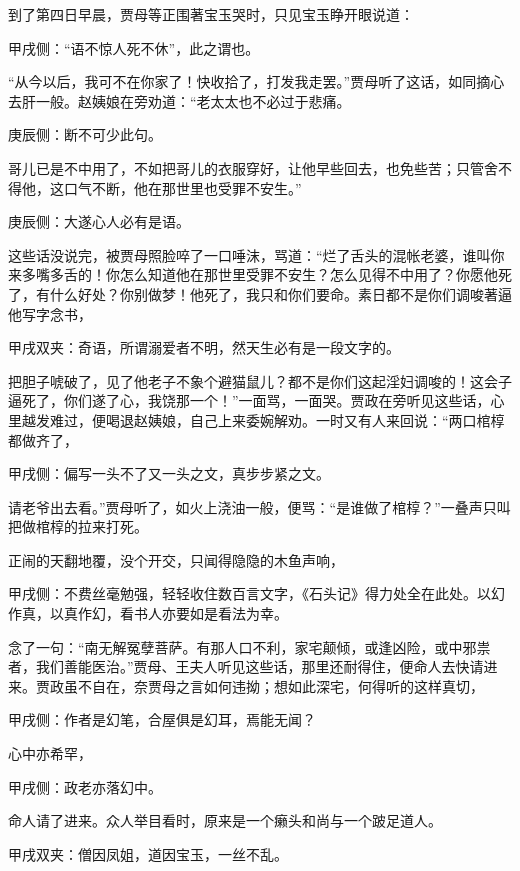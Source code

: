\begin{parag}
    到了第四日早晨，贾母等正围著宝玉哭时，只见宝玉睁开眼说道：\begin{note}甲戌侧：“语不惊人死不休”，此之谓也。\end{note}“从今以后，我可不在你家了！快收拾了，打发我走罢。”贾母听了这话，如同摘心去肝一般。赵姨娘在旁劝道：“老太太也不必过于悲痛。\begin{note}庚辰侧：断不可少此句。\end{note}哥儿已是不中用了，不如把哥儿的衣服穿好，让他早些回去，也免些苦；只管舍不得他，这口气不断，他在那世里也受罪不安生。”\begin{note}庚辰侧：大遂心人必有是语。\end{note}这些话没说完，被贾母照脸啐了一口唾沫，骂道：“烂了舌头的混帐老婆，谁叫你来多嘴多舌的！你怎么知道他在那世里受罪不安生？怎么见得不中用了？你愿他死了，有什么好处？你别做梦！他死了，我只和你们要命。素日都不是你们调唆著逼他写字念书，\begin{note}甲戌双夹：奇语，所谓溺爱者不明，然天生必有是一段文字的。\end{note}把胆子唬破了，见了他老子不象个避猫鼠儿？都不是你们这起淫妇调唆的！这会子逼死了，你们遂了心，我饶那一个！”一面骂，一面哭。贾政在旁听见这些话，心里越发难过，便喝退赵姨娘，自己上来委婉解劝。一时又有人来回说：“两口棺椁都做齐了，\begin{note}甲戌侧：偏写一头不了又一头之文，真步步紧之文。\end{note}请老爷出去看。”贾母听了，如火上浇油一般，便骂：“是谁做了棺椁？”一叠声只叫把做棺椁的拉来打死。
\end{parag}


\begin{parag}
    正闹的天翻地覆，没个开交，只闻得隐隐的木鱼声响，\begin{note}甲戌侧：不费丝毫勉强，轻轻收住数百言文字，《石头记》得力处全在此处。以幻作真，以真作幻，看书人亦要如是看法为幸。\end{note}念了一句：“南无解冤孽菩萨。有那人口不利，家宅颠倾，或逢凶险，或中邪祟者，我们善能医治。”贾母、王夫人听见这些话，那里还耐得住，便命人去快请进来。贾政虽不自在，奈贾母之言如何违拗；想如此深宅，何得听的这样真切，\begin{note}甲戌侧：作者是幻笔，合屋俱是幻耳，焉能无闻？\end{note}心中亦希罕，\begin{note}甲戌侧：政老亦落幻中。\end{note}命人请了进来。众人举目看时，原来是一个癞头和尚与一个跛足道人。\begin{note}甲戌双夹：僧因凤姐，道因宝玉，一丝不乱。\end{note}
\end{parag}


